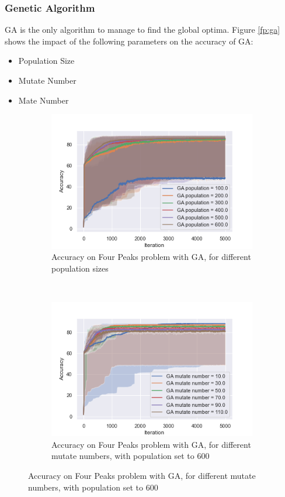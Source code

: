 \documentclass[twocolumn, 10pt]{article}
\begin{document}
			\subsubsection*{Genetic Algorithm}
				GA is the only algorithm to manage to find the global optima. Figure \ref{fp:ga} shows the impact of the following parameters on the accuracy of GA:
				\begin{itemize}
					\item Population Size
					\item Mutate Number
					\item Mate Number
				\end{itemize}

				\begin{figure}[h]
					\centering
					\begin{subfigure}[t]{\columnwidth}
						\centering
						\includegraphics[width=0.68\linewidth]{../graphics/four_peaks_GA_Iteration_Error_GA_population.png}
						\caption{Accuracy on Four Peaks problem with GA, for different population sizes}
						\label{fp:ga_pop}
					\end{subfigure}
					~
					\begin{subfigure}[t]{\columnwidth}
						\centering
						\includegraphics[width=0.68\linewidth]{../graphics/four_peaks_GA_Iteration_Error_GA_mutate_number.png}
						\caption{Accuracy on Four Peaks problem with GA, for different mutate numbers, with population set to 600}

\end{subfigure}
\end{figure}
\end{document}
